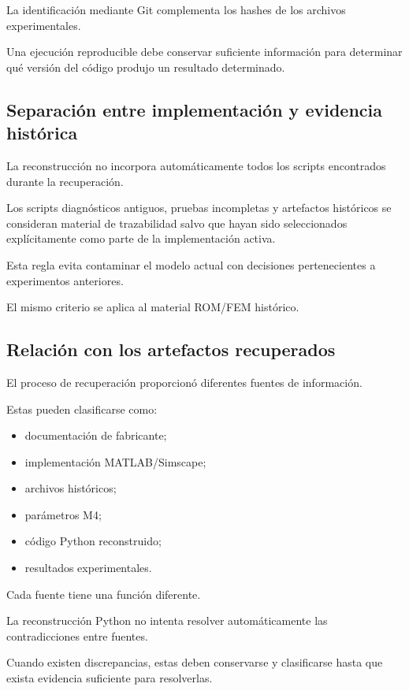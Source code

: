 La identificación mediante Git complementa los hashes de los archivos experimentales.

Una ejecución reproducible debe conservar suficiente información para determinar qué versión del código produjo un resultado determinado.

\subsection{Separación entre implementación y evidencia histórica}

La reconstrucción no incorpora automáticamente todos los scripts encontrados durante la recuperación.

Los scripts diagnósticos antiguos, pruebas incompletas y artefactos históricos se consideran material de trazabilidad salvo que hayan sido seleccionados explícitamente como parte de la implementación activa.

Esta regla evita contaminar el modelo actual con decisiones pertenecientes a experimentos anteriores.

El mismo criterio se aplica al material ROM/FEM histórico.

\subsection{Relación con los artefactos recuperados}

El proceso de recuperación proporcionó diferentes fuentes de información.

Estas pueden clasificarse como:

\begin{itemize}
    \item documentación de fabricante;
    \item implementación MATLAB/Simscape;
    \item archivos históricos;
    \item parámetros M4;
    \item código Python reconstruido;
    \item resultados experimentales.
\end{itemize}

Cada fuente tiene una función diferente.

La reconstrucción Python no intenta resolver automáticamente las contradicciones entre fuentes.

Cuando existen discrepancias, estas deben conservarse y clasificarse hasta que exista evidencia suficiente para resolverlas.

